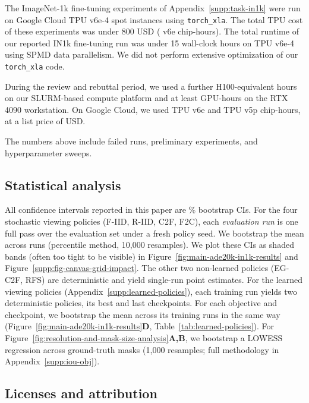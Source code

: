 \documentclass{article}
\begin{document}
The ImageNet-1k fine-tuning experiments of Appendix~\ref{supp:task-in1k} were run on Google Cloud TPU v6e-4 spot instances using \texttt{torch\_xla}. The total TPU cost of these experiments was under 800 USD (\computeAprilChipHours{} v6e chip-hours). The total runtime of our reported IN1k fine-tuning run was under 15 wall-clock hours on TPU v6e-4 using SPMD data parallelism. We did not perform extensive optimization of our \texttt{torch\_xla} code.

During the review and rebuttal period, we used a further \computeSlurmHours{} H100-equivalent hours on our SLURM-based compute platform and
at least \computeRtxHours{} GPU-hours on the RTX 4090 workstation.
On Google Cloud, we used \computeTpuVsixeChipHours{} TPU v6e and \computeTpuVfivepChipHours{} TPU v5p chip-hours, at a list price of \computeTpuUsd{} USD.

The numbers above include failed runs, preliminary experiments, and hyperparameter sweeps.

\subsection{Statistical analysis}
\label{supp:declarations:statistical-analysis}

All confidence intervals reported in this paper are \bootstrapCiPct\% bootstrap CIs.
For the four stochastic viewing policies (F-IID, R-IID, C2F, F2C), each \emph{evaluation run} is one full pass over the evaluation set under a fresh policy seed. We bootstrap the mean across runs (percentile method, 10{,}000 resamples). We plot these CIs as shaded bands (often too tight to be visible) in Figure~\ref{fig:main-ade20k-in1k-results} and Figure~\ref{supp:fig-canvas-grid-impact}. The other two non-learned policies (EG-C2F, RFS) are deterministic and yield single-run point estimates.
For the learned viewing policies (Appendix~\ref{supp:learned-policies}), each training run yields two deterministic policies, its best and last checkpoints. For each objective and checkpoint, we bootstrap the mean across its \rlTrainingRuns{} training runs in the same way (Figure~\ref{fig:main-ade20k-in1k-results}\textbf{D}, Table~\ref{tab:learned-policies}).
For Figure~\ref{fig:resolution-and-mask-size-analysis}\textbf{A,B}, we bootstrap a LOWESS regression across ground-truth masks (1{,}000 resamples; full methodology in Appendix~\ref{supp:iou-obj}).

\subsection{Licenses and attribution}
\label{supp:declarations:licenses-and-attribution}
\end{document}
